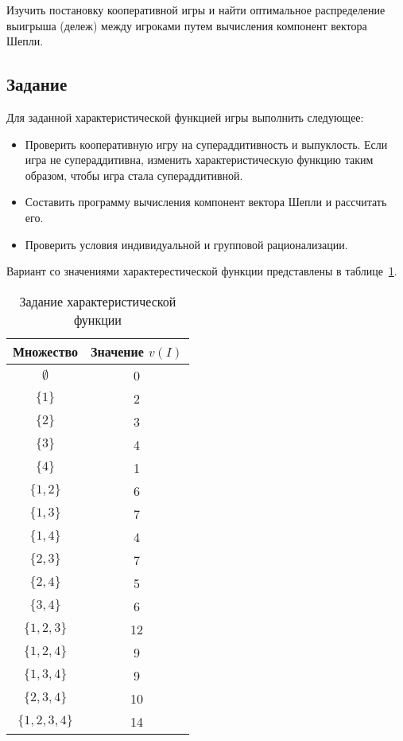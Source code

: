 
Изучить постановку кооперативной игры и найти оптимальное распределение
выигрыша (дележ) между игроками путем вычисления компонент вектора Шепли.

\subsection*{Задание}

Для заданной характеристической функцией игры выполнить следующее:

\begin{itemize}
  \item Проверить кооперативную игру на супераддитивность и
        выпуклость. Если игра не супераддитивна, изменить характеристическую
        функцию таким образом, чтобы игра стала супераддитивной.
  \item Составить программу вычисления компонент вектора
        Шепли и рассчитать его.
  \item Проверить условия индивидуальной и групповой рационализации.
\end{itemize}

Вариант со значениями характерестической функции представлены в таблице~\ref{tab:tab01}.

\begin{table}[h!]
\centering
\caption{Задание характеристической функции}
\begin{tabular}{|c|c|}
\hline
\textbf{Множество} & \textbf{Значение }$v(I)$ \\ \hline
$\emptyset$ & 0 \\ \hline
$\{1\}$ & 2 \\ \hline
$\{2\}$ & 3 \\ \hline
$\{3\}$ & 4 \\ \hline
$\{4\}$ & 1 \\ \hline
$\{1,2\}$ & 6 \\ \hline
$\{1,3\}$ & 7 \\ \hline
$\{1,4\}$ & 4 \\ \hline
$\{2,3\}$ & 7 \\ \hline
$\{2,4\}$ & 5 \\ \hline
$\{3,4\}$ & 6 \\ \hline
$\{1,2,3\}$ & 12 \\ \hline
$\{1,2,4\}$ & 9 \\ \hline
$\{1,3,4\}$ & 9 \\ \hline
$\{2,3,4\}$ & 10 \\ \hline
$\{1,2,3,4\}$ & 14 \\ \hline
\end{tabular}
\label{tab:tab01}
\end{table}
